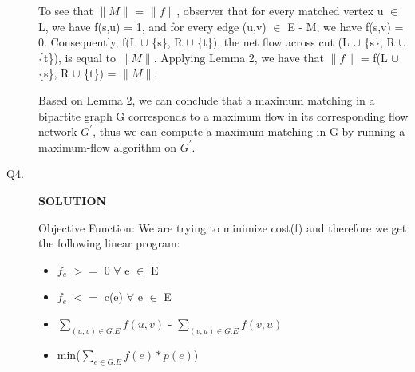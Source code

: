 \documentclass[11pt]{csc_assignment}
\begin{document}
\begin{description}
To see that $\|M\|$ = $\|f\|$, observer that for every matched vertex u $\in$ L, we have f(s,u) = 1, and for every edge (u,v) $\in$ E - M, we have f(s,v) = 0. Consequently, f(L $\cup$ \{s\}, R $\cup$ \{t\}), the net flow across cut (L $\cup$ \{s\}, R $\cup$ \{t\}), is equal to $\|M\|$. Applying Lemma 2, we have that $\|f\|$ = f(L $\cup$ \{s\}, R $\cup$ \{t\}) = $\|M\|$.

Based on Lemma 2, we can conclude that a maximum matching in a bipartite graph G corresponds to a maximum flow in its corresponding flow network $G^{'}$, thus we can compute a maximum matching in G by running a maximum-flow algorithm on $G^{'}$.

\newpage
\item[Q4.]


\textbf{SOLUTION}

Objective Function: We are trying to minimize cost(f) and therefore we get the following linear program:

\begin{itemize}
	\item $f_e$ $>=$ 0 $\forall$ e $\in$ E
	\item $f_e$ $<=$ c(e) $\forall$ e $\in$ E
	\item $\sum\limits_{(u, v) \in G.E} f(u,v)$ - $\sum\limits_{(v, u) \in G.E} f(v,u)$
	\item min($\sum\limits_{e \in G.E} f(e)*p(e)$)
\end{itemize}



\end{description}
\end{document}
